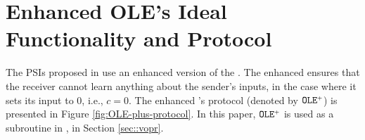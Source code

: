 

\section{Enhanced OLE's Ideal Functionality and Protocol}\label{apndx:F-OLE-plus}



The PSIs proposed in \cite{GhoshN19} use an enhanced version of the  \ole.  The enhanced \ole ensures that the receiver cannot learn anything about the sender's inputs,  in the case where it sets its input to $0$, i.e., $c=0$. The enhanced \ole's protocol (denoted by $\mathtt{OLE}^{\scriptscriptstyle +}$) is presented in Figure \ref{fig:OLE-plus-protocol}. In this paper, $\mathtt{OLE}^{\scriptscriptstyle +}$ is used as a subroutine in \vopr, in Section \ref{sec::vopr}. 



%






